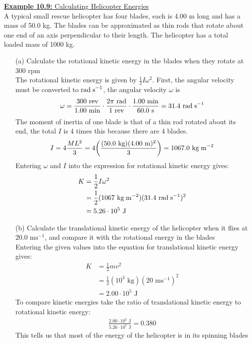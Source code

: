 \documentclass[a4paper]{article}
\let\bf\textbf
\newcommand\rads{\text{ rad\;s}^{-1}}
\newcommand\rad{\text{ rad}}
\newcommand\s{\text{ s}}
\newcommand\m{\text{ m}}
\newcommand\J{\text{ J}}
\newcommand\ms{\text{ ms}^{-1}}
\newcommand\kg{\text{ kg}}
\newcommand\kgmm{\text{ kg\;m}^{-2}}
\begin{document}
\begin{shaded}
    \underline{\bf{Example 10.9:} Calculating Helicopter Energies}
    \vspace{2mm}\\
    A typical small rescue helicopter has four blades, each is 4.00 m long and has a mass of 50.0 kg. The blades can be approximated as thin rods that rotate about one end of an axis perpendicular to their length. The helicopter has a total loaded mass of 1000 kg.
    \begin{enumerate}
        \item[(a)] Calculate the rotational kinetic energy in the blades when they rotate at 300 rpm
        \vspace{2mm}\\
        The rotational kinetic energy is given by $\frac{1}{2}I\omega^2$. First, the angular velocity must be converted to$\rads$, the angular velocity $\omega$ is
        \begin{align*}
            \omega = \frac{300\text{ rev}}{1.00\text{ min}} \cdot \frac{2\pi\rad}{1\text{ rev}} \cdot \frac{1.00\text{ min}}{60.0\s} = 31.4\rads
        \end{align*}
        The moment of inertia of one blade is that of a thin rod rotated about its end, the total $I$ is 4 times this because there are 4 blades.
        \begin{align*}
            I = 4\frac{ML^2}{3} = 4\bigg(\frac{(50.0\kg)(4.00\m)^2}{3}\bigg) = 1067.0\kgmm
        \end{align*}
        Entering $\omega$ and $I$ into the expression for rotational kinetic energy gives:
        \begin{align*}
            K &= \frac{1}{2}I\omega^2\\
            &= \frac{1}{2}(1067\kgmm)(31.4\rads)^2\\
            &= 5.26 \cdot 10^5\J
        \end{align*}
        \item[(b)] Calculate the translational kinetic energy of the helicopter when it flies at 20.0$\ms$, and compare it with the rotational energy in the blades
        \vspace{1mm}\\
        Entering the given values into the equation for translational kinetic energy gives:
        \begin{align*}
            K &= \frac{1}{2}mv^2\\
            &= \frac{1}{2}(10^3\kg)(20\ms)^2\\
            &= 2.00 \cdot 10^5\J
        \end{align*}
        To compare kinetic energies take the ratio of translational kinetic energy to rotational kinetic energy:
        \begin{align*}
            \frac{2.00 \cdot 10^5\J}{5.26 \cdot 10^5\J} = 0.380
        \end{align*}
        This tells us that most of the energy of the helicopter is in its spinning blades
    \end{enumerate}
\end{shaded}
\end{document}
